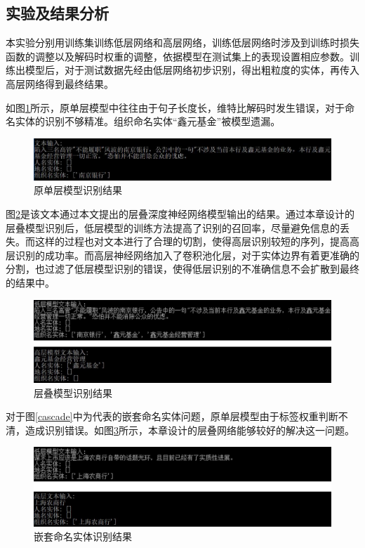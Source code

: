 \documentclass[winfonts,master,oneside,nobackinfo]{njuthesis}
\begin{document}
\subsection{实验及结果分析}

本实验分别用训练集训练低层网络和高层网络，训练低层网络时涉及到训练时损失函数的调整以及解码时权重的调整，依据模型在测试集上的表现设置相应参数。训练出模型后，对于测试数据先经由低层网络初步识别，得出粗粒度的实体，再传入高层网络得到最终结果。

如图\ref{one-layer}所示，原单层模型中往往由于句子长度长，维特比解码时发生错误，对于命名实体的识别不够精准。组织命名实体“鑫元基金”被模型遗漏。

\begin{figure}[h]
\centering
\includegraphics[width=1\textwidth]{./figure/原单层模型.jpg}
\caption{原单层模型识别结果}
\label{one-layer}
\end{figure}

图\ref{prob1}是该文本通过本文提出的层叠深度神经网络模型输出的结果。通过本章设计的层叠模型识别后，低层模型的训练方法提高了识别的召回率，尽量避免信息的丢失。而这样的过程也对文本进行了合理的切割，使得高层识别较短的序列，提高高层识别的成功率。而高层神经网络加入了卷积池化层，对于实体边界有着更准确的分割，也过滤了低层模型识别的错误，使得低层识别的不准确信息不会扩散到最终的结果中。

\begin{figure}[h]
\centering
\includegraphics[width=1\textwidth]{./figure/层叠模型效果.jpg}
\caption{层叠模型识别结果}
\label{prob1}
\end{figure}

对于图\ref{cascade}中为代表的嵌套命名实体问题，原单层模型由于标签权重判断不清，造成识别错误。如图\ref{solve-cascade}所示，本章设计的层叠网络能够较好的解决这一问题。

\begin{figure}[H]
\centering
\includegraphics[width=1\textwidth]{./figure/层叠模型嵌套命名实体.jpg}
\caption{嵌套命名实体识别结果}
\label{solve-cascade}
\end{figure}
\end{document}
